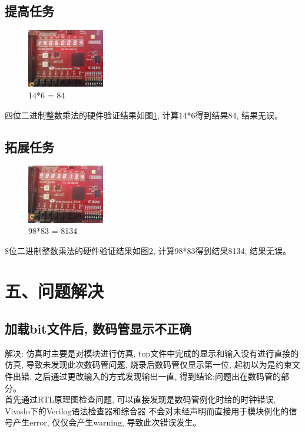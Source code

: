 \documentclass{article}
\newcommand{\fourhao}{\fontsize{14pt}{\baselineskip}\selectfont} %
\newcommand{\xiaosihao}{\fontsize{12pt}{\baselineskip}\selectfont} %
\begin{document}
\subsection*{提高任务}
\begin{figure}[H]
    \centering
    \includegraphics[width=0.3\textwidth]{image/2024-06-24-13-19-25.png}
    \caption{14*6 = 84}
    \label{image_verify_3}
\end{figure}
四位二进制整数乘法的硬件验证结果如图\ref{image_verify_3}, 计算14*6得到结果84, 结果无误。
\subsection*{拓展任务}
\begin{figure}[H]
    \centering
    \includegraphics[width=0.3\textwidth]{image/2024-06-24-13-18-41.png}
    \caption{98*83 = 8134}
    \label{image_verify_4}
\end{figure}
8位二进制整数乘法的硬件验证结果如图\ref{image_verify_4}, 计算98*83得到结果8134, 结果无误。
\section*{\fourhao 五、问题解决}
\xiaosihao
{}
\subsection*{加载bit文件后, 数码管显示不正确}
解决: 仿真时主要是对模块进行仿真, top文件中完成的显示和输入没有进行直接的仿真, 导致未发现此次数码管问题, 
烧录后数码管仅显示第一位, 起初以为是约束文件出错, 之后通过更改输入的方式发现输出一直, 得到结论:问题出在数码管的部分。\\

首先通过RTL原理图检查问题, 可以直接发现是数码管例化时给的时钟错误, Vivado下的Verilog语法检查器和综合器
不会对未经声明而直接用于模块例化的信号产生error, 仅仅会产生warning, 导致此次错误发生。
\end{document}
